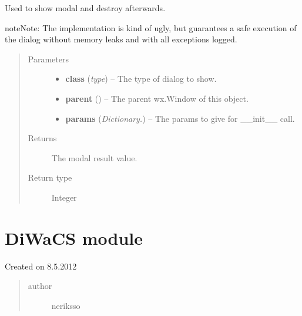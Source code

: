 \documentclass[letterpaper,10pt,english]{sphinxmanual}
\begin{document}
\begin{fulllineitems}
\label{dialogs:dialogs.show_modal_and_destroy}
Used to show modal and destroy afterwards.

\begin{notice}{note}{Note:}
The implementation is kind of ugly, but guarantees a safe execution
of the dialog without memory leaks and with all exceptions logged.
\end{notice}
\begin{quote}\begin{description}
\item[{Parameters}] \leavevmode\begin{itemize}
\item {} 
\textbf{class} (\emph{type}) -- The type of dialog to show.

\item {} 
\textbf{parent} () -- The parent wx.Window of this object.

\item {} 
\textbf{params} (\emph{Dictionary.}) -- The params to give for \_\_init\_\_ call.

\end{itemize}

\item[{Returns}] \leavevmode
The modal result value.

\item[{Return type}] \leavevmode
Integer

\end{description}\end{quote}

\end{fulllineitems}



\section{DiWaCS module}
\label{diwacs:diwacs-module}\label{diwacs:module-diwacs}\label{diwacs::doc}
Created on 8.5.2012
\begin{quote}\begin{description}
\item[{author}] \leavevmode
neriksso

\end{description}\end{quote}
\end{document}
